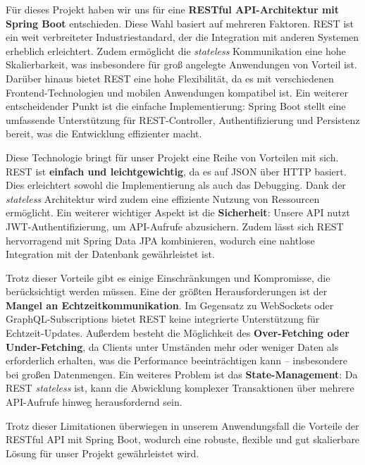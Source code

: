 \documentclass[a4paper, 11pt]{article}
\begin{document}
Für dieses Projekt haben wir uns für eine \textbf{RESTful API-Architektur mit Spring Boot} entschieden. Diese Wahl basiert auf mehreren Faktoren. REST ist ein weit verbreiteter Industriestandard, der die Integration mit anderen Systemen erheblich erleichtert. Zudem ermöglicht die \textit{stateless} Kommunikation eine hohe Skalierbarkeit, was insbesondere für groß angelegte Anwendungen von Vorteil ist. Darüber hinaus bietet REST eine hohe Flexibilität, da es mit verschiedenen Frontend-Technologien und mobilen Anwendungen kompatibel ist. Ein weiterer entscheidender Punkt ist die einfache Implementierung: Spring Boot stellt eine umfassende Unterstützung für REST-Controller, Authentifizierung und Persistenz bereit, was die Entwicklung effizienter macht.

Diese Technologie bringt für unser Projekt eine Reihe von Vorteilen mit sich. REST ist \textbf{einfach und leichtgewichtig}, da es auf JSON über HTTP basiert. Dies erleichtert sowohl die Implementierung als auch das Debugging. Dank der \textit{stateless} Architektur wird zudem eine effiziente Nutzung von Ressourcen ermöglicht. Ein weiterer wichtiger Aspekt ist die \textbf{Sicherheit}: Unsere API nutzt JWT-Authentifizierung, um API-Aufrufe abzusichern. Zudem lässt sich REST hervorragend mit Spring Data JPA kombinieren, wodurch eine nahtlose Integration mit der Datenbank gewährleistet ist.

Trotz dieser Vorteile gibt es einige Einschränkungen und Kompromisse, die berücksichtigt werden müssen. Eine der größten Herausforderungen ist der \textbf{Mangel an Echtzeitkommunikation}. Im Gegensatz zu WebSockets oder GraphQL-Subscriptions bietet REST keine integrierte Unterstützung für Echtzeit-Updates. Außerdem besteht die Möglichkeit des \textbf{Over-Fetching oder Under-Fetching}, da Clients unter Umständen mehr oder weniger Daten als erforderlich erhalten, was die Performance beeinträchtigen kann – insbesondere bei großen Datenmengen. Ein weiteres Problem ist das \textbf{State-Management}: Da REST \textit{stateless} ist, kann die Abwicklung komplexer Transaktionen über mehrere API-Aufrufe hinweg herausfordernd sein.

Trotz dieser Limitationen überwiegen in unserem Anwendungsfall die Vorteile der RESTful API mit Spring Boot, wodurch eine robuste, flexible und gut skalierbare Lösung für unser Projekt gewährleistet wird.

\end{document}
